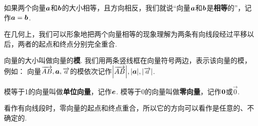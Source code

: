 \begin{definition}
如果两个向量\(\boldsymbol{a}\)和\(\boldsymbol{b}\)的大小相等，且方向相反，我们就说“向量\(\boldsymbol{a}\)和\(\boldsymbol{b}\)是\textbf{相等}的”，记作\(\boldsymbol{a}=\boldsymbol{b}\).
\end{definition}
在几何上，我们可以形象地把两个向量相等的现象理解为两条有向线段经过平移以后，两者的起点和终点分别完全重合.

\begin{definition}
向量的大小叫做向量的\textbf{模}.
我们用两条竖线框在向量符号两边，表示该向量的模，例如：
向量\(\overrightarrow{AB},\boldsymbol{a},\overrightarrow{a}\)的模依次记作\(\abs{\overrightarrow{AB}},\abs{\boldsymbol{a}},\abs{\overrightarrow{a}}\).
\end{definition}

\begin{definition}
模等于1的向量叫做\textbf{单位向量}，记作\(\boldsymbol{e}\).
模等于0的向量叫做\textbf{零向量}，记作\(\boldsymbol{0}\)或\(\vec{0}\).
\end{definition}
看作有向线段时，零向量的起点和终点重合，所以它的方向可以看作是任意的、不确定的.

